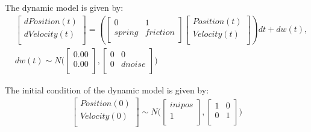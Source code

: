 \documentclass[fleqn]{article}
\begin{document}
The dynamic model is given by:
\begin{align*}
&%
\begin{bmatrix}{}
  dPosition(t) \\ 
  dVelocity(t) \\ 
  \end{bmatrix}
=(%
\begin{bmatrix}{}
  0 & 1 \\ 
  spring & friction \\ 
  \end{bmatrix}
\begin{bmatrix}{}
  Position(t) \\ 
  Velocity(t) \\ 
  \end{bmatrix}
)dt + dw(t),\\&dw(t) \sim N\Big(%
\begin{bmatrix}{}
  0.00 \\ 
  0.00 \\ 
  \end{bmatrix}
,%
\begin{bmatrix}{}
  0 & 0 \\ 
  0 & dnoise \\ 
  \end{bmatrix}
\Big)
\end{align*}

The initial condition of the dynamic model is given by:
\begin{align*}
\begin{bmatrix}{}
  Position(0) \\ 
  Velocity(0) \\ 
  \end{bmatrix}
\sim N \Big(%
\begin{bmatrix}{}
  inipos \\ 
  1 \\ 
  \end{bmatrix}
, %
\begin{bmatrix}{}
  1 & 0 \\ 
  0 & 1 \\ 
  \end{bmatrix}
\Big)
\end{align*}
\end{document}
